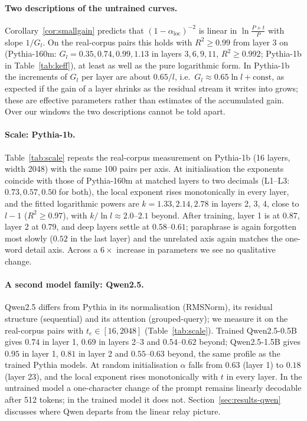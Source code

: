 \documentclass[11pt]{article}
\theoremstyle{definition}
\theoremstyle{remark}
\begin{document}
\paragraph{Two descriptions of the untrained curves.} Corollary~\ref{cor:smallgain} predicts that $(1-\alpha_{\mathrm{loc}})^{-2}$ is linear in $\ln\frac{P+t}{P}$ with slope $1/G_l$. On the real-corpus pairs this holds with $R^2\ge0.99$ from layer 3 on (Pythia-160m: $G_l=0.35, 0.74, 0.99, 1.13$ in layers $3, 6, 9, 11$, $R^2\ge0.992$; Pythia-1b in Table~\ref{tab:keff}), at least as well as the pure logarithmic form. In Pythia-1b the increments of $G_l$ per layer are about $0.65/l$, i.e.\ $G_l\approx0.65\ln l+\mathrm{const}$, as expected if the gain of a layer shrinks as the residual stream it writes into grows; these are effective parameters rather than estimates of the accumulated gain. Over our windows the two descriptions cannot be told apart.

\paragraph{Scale: Pythia-1b.} Table~\ref{tab:scale} repeats the real-corpus measurement on Pythia-1b (16 layers, width 2048) with the same 100 pairs per axis. At initialisation the exponents coincide with those of Pythia-160m at matched layers to two decimals (L1--L3: $0.73, 0.57, 0.50$ for both), the local exponent rises monotonically in every layer, and the fitted logarithmic powers are $k=1.33, 2.14, 2.78$ in layers 2, 3, 4, close to $l-1$ ($R^2\ge0.97$), with $k/\ln l\approx2.0$--$2.1$ beyond. After training, layer 1 is at $0.87$, layer 2 at $0.79$, and deep layers settle at $0.58$--$0.61$; paraphrase is again forgotten most slowly ($0.52$ in the last layer) and the unrelated axis again matches the one-word detail axis. Across a $6\times$ increase in parameters we see no qualitative change.

\paragraph{A second model family: Qwen2.5.} Qwen2.5 differs from Pythia in its normalisation (RMSNorm), its residual structure (sequential) and its attention (grouped-query); we measure it on the real-corpus pairs with $t_e\in[16,2048]$ (Table~\ref{tab:scale}). Trained Qwen2.5-0.5B gives $0.74$ in layer 1, $0.69$ in layers 2--3 and $0.54$--$0.62$ beyond; Qwen2.5-1.5B gives $0.95$ in layer 1, $0.81$ in layer 2 and $0.55$--$0.63$ beyond, the same profile as the trained Pythia models. At random initialisation $\alpha$ falls from $0.63$ (layer 1) to $0.18$ (layer 23), and the local exponent rises monotonically with $t$ in every layer. In the untrained model a one-character change of the prompt remains linearly decodable after 512 tokens; in the trained model it does not. Section~\ref{sec:results-qwen} discusses where Qwen departs from the linear relay picture.
\end{document}
